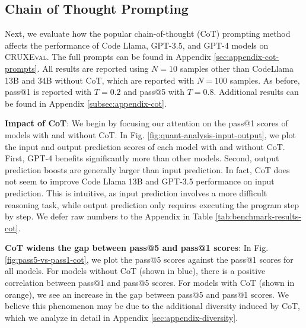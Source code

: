 \documentclass{article}
\newcommand{\benchmark}{\textsc{CRUXEval}\xspace}
\theoremstyle{plain}
\theoremstyle{definition}
\theoremstyle{remark}
\begin{document}
\subsection{Chain of Thought Prompting} \label{subsec:cot}
Next, we evaluate how the popular chain-of-thought (CoT) prompting method \citep{wei2022chain} affects the performance of Code Llama, GPT-3.5, and GPT-4 models on \benchmark. The full prompts can be found in Appendix \ref{sec:appendix-cot-prompts}. All results are reported using $N=10$ samples other than CodeLlama 13B and 34B without CoT, which are reported with $N=100$ samples. As before, pass@1 is reported with $T=0.2$ and pass@5 with $T=0.8$. Additional results can be found in Appendix \ref{subsec:appendix-cot}.

\textbf{Impact of CoT}: We begin by focusing our attention on the pass@1 scores of models with and without CoT. In Fig. \ref{fig:quant-analysis-input-output}, we plot the input and output prediction scores of each model with and without CoT. First, GPT-4 benefits significantly more than other models. Second, output prediction boosts are generally larger than input prediction. In fact, CoT does not seem to improve Code Llama 13B and GPT-3.5 performance on input prediction. This is intuitive, as input prediction involves a more difficult reasoning task, while output prediction only requires executing the program step by step. We defer raw numbers to the Appendix in Table \ref{tab:benchmark-results-cot}.


\textbf{CoT widens the gap between pass@5 and pass@1 scores}: In Fig. \ref{fig:pass5-vs-pass1-cot}, we plot the pass@5 scores against the pass@1 scores for all models. For models without CoT (shown in blue), there is a positive correlation between pass@1 and pass@5 scores. For models with CoT (shown in orange), we see an increase in the gap between pass@5 and pass@1 scores. We believe this phenomenon may be due to the additional diversity induced by CoT, which we analyze in detail in Appendix \ref{sec:appendix-diversity}.
\end{document}

